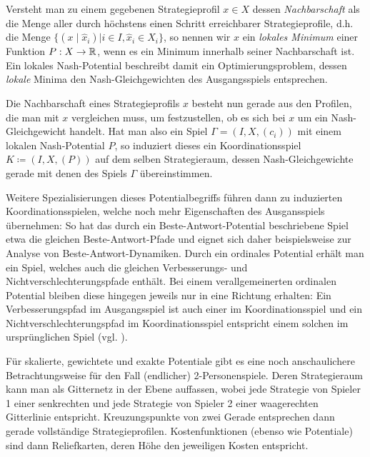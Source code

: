 Versteht man zu einem gegebenen Strategieprofil $x \in X$ dessen \emph{Nachbarschaft} als die Menge aller durch höchstens einen Schritt erreichbarer Strategieprofile, d.h. die Menge $\{(x \mid \hat{x}_i) | i \in I, \hat{x}_i \in X_i\}$, so nennen wir $x$ ein \emph{lokales Minimum} einer Funktion $P: X \to \mathbb{R}$, wenn es ein Minimum innerhalb seiner Nachbarschaft ist. Ein lokales Nash-Potential beschreibt damit ein Optimierungsproblem, dessen \emph{lokale} Minima den Nash-Gleichgewichten des Ausgangsspiels entsprechen.

Die Nachbarschaft eines Strategieprofils $x$ besteht nun gerade aus den Profilen, die man mit $x$ vergleichen muss, um festzustellen, ob es sich bei $x$ um ein Nash-Gleichgewicht handelt. Hat man also ein Spiel $\Gamma = (I, X, (c_i))$ mit einem lokalen Nash-Potential $P$, so induziert dieses ein Koordinationsspiel $K \coloneqq (I, X, (P))$ auf dem selben Strategieraum, dessen Nash-Gleichgewichte gerade mit denen des Spiels $\Gamma$ übereinstimmen.

Weitere Spezialisierungen dieses Potentialbegriffs führen dann zu induzierten Koordinationsspielen, welche noch mehr Eigenschaften des Ausgansspiels übernehmen: So hat das durch ein Beste-Antwort-Potential beschriebene Spiel etwa die gleichen Beste-Antwort-Pfade und eignet sich daher beispielsweise zur Analyse von Beste-Antwort-Dynamiken. Durch ein ordinales Potential erhält man ein Spiel, welches auch die gleichen Verbesserungs- und Nichtverschlechterungspfade enthält. Bei einem verallgemeinerten ordinalen Potential bleiben diese hingegen jeweils nur in eine Richtung erhalten: Ein Verbesserungspfad im Ausgangsspiel ist auch einer im Koordinationsspiel und ein Nichtverschlechterungspfad im Koordinationsspiel entspricht einem solchen im ursprünglichen Spiel (vgl. ).

Für skalierte, gewichtete und exakte Potentiale gibt es eine noch anschaulichere Betrachtungsweise für den Fall (endlicher) 2-Personenspiele. Deren Strategieraum kann man als Gitternetz in der Ebene auffassen, wobei jede Strategie von Spieler 1 einer senkrechten und jede Strategie von Spieler 2 einer waagerechten Gitterlinie entspricht. Kreuzungspunkte von zwei Gerade entsprechen dann gerade vollständige Strategieprofilen. Kostenfunktionen (ebenso wie Potentiale) sind dann \glqq Reliefkarten\grqq{}, deren Höhe den jeweiligen Kosten entspricht. 

